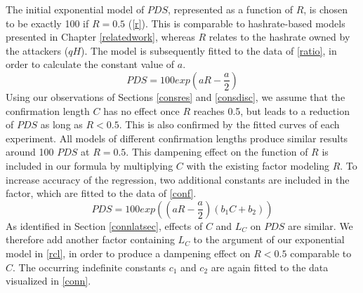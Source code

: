\documentclass[a4paper,12pt,twoside]{report}
\begin{document}
The initial exponential model of $PDS$, represented as a function of $R$, is chosen to be exactly 100 if $R = 0.5$ (\autoref{r}). This is comparable to hashrate-based models presented in Chapter \ref{relatedwork}, whereas $R$ relates to the hashrate owned by the attackers ($qH$).  The model is subsequently fitted to the data of \autoref{ratio}, in order to calculate the constant value of $a$.
\begin{equation}\label{r}
PDS = 100 exp \left(a R- \frac{a}{2} \right)
\end{equation}
Using our observations of Sections \ref{consres} and \ref{consdisc}, we assume that the confirmation length $C$ has no effect once $R$ reaches 0.5, but leads to a reduction of $PDS$ as long as $R < 0.5$. This is also confirmed by the fitted curves of each experiment. All models of different confirmation lengths produce similar results around 100 $PDS$ at $R = 0.5$. This dampening effect on the function of $R$ is included in our formula by multiplying $C$ with the existing factor modeling $R$. To increase accuracy of the regression, two additional constants are included in the factor, which are fitted to the data of \autoref{conf}.
\begin{equation}\label{rc}
PDS = 100 exp \left( \left( a R- \frac{a}{2} \right) \left( b_1C+b_2 \right) \right)
\end{equation}
As identified in Section \ref{connlatsec}, effects of $C$ and $L_C$ on $PDS$ are similar. We therefore add another factor containing $L_C$ to the argument of our exponential model in \autoref{rcl}, in order to produce a dampening effect on $R < 0.5$ comparable to $C$. The occurring indefinite constants $c_1$ and $c_2$ are again fitted to the data visualized in \autoref{conn}. 
\end{document}
